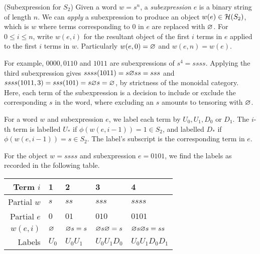 \begin{definition}(Subexpression for $S_2$)
    \label{def:subexpression-S2}
    Given a word $w = s^n$, a \textit{subexpression} $e$ is a binary string of length $n$. We can \textit{apply} a subexpression to produce an object $w(e) \in \mathcal{H}(S_2)$, which is $w$ where terms corresponding to $0$ in $e$ are replaced with $\varnothing$. For $0 \leq i \leq n$, write $w(e,i)$ for the resultant object of the first $i$ terms in $e$ applied to the first $i$ terms in $w$. Particularly $w(e,0) = \varnothing$ and $w(e,n) = w(e)$.
\end{definition}

For example, $0000, 0110$ and $1011$ are subexpressions of $s^4=ssss$. Applying the third subexpression gives $ssss(1011) = s\varnothing ss = sss$ and $ssss(1011,3) = sss(101) = s \varnothing s = \varnothing$, by strictness of the monoidal category. Here, each term of the subexpression is a decision to include or exclude the corresponding $s$ in the word, where excluding an $s$ amounts to tensoring with $\varnothing$.

For a word $w$ and subexpression $e$, we label each term by $U_0,U_1,D_0$ or $D_1$. The $i$-th term is labelled $U_*$ if $\phi(w(e,i-1)) = 1 \in S_2$, and labelled $D_*$ if $\phi(w(e,i-1)) = s \in S_2$. The label's subscript is the corresponding term in $e$.

\begin{example} \label{eg:one-col-light-leaf-label}
    For the object $w = ssss$ and subexpression $e = 0101$, we find the labels as recorded in the following table.
    \begin{center}
        \begin{tabular}{ |r||l|l|l|l| }
            \hline
            Term $i$    & 1     & 2           & 3             & 4                 \\ \hline
            Partial $w$ & $s$   & $ss$        & $sss$         & $ssss$            \\ \hline
            Partial $e$ & $0$   & $01$        & $010$         & $0101$            \\ \hline
            $w(e,i)$    & $\varnothing$ & $\varnothing s = s$ & $\varnothing s \varnothing=s$ & $\varnothing s \varnothing s=ss$  \\ \hline
            Labels      & $U_0$ & $U_0 U_1$   & $U_0 U_1 D_0$ & $U_0 U_1 D_0 D_1$ \\ \hline
        \end{tabular}
    \end{center}
\end{example}


